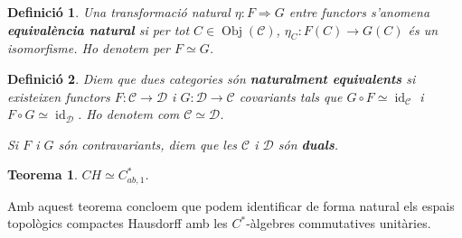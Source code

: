 \documentclass{article}
\newtheorem{teorema}{Teorema}
\newtheorem{definicio}{Definici\'{o}}
\theoremstyle{definition}
\DeclareMathOperator{\Obj}{Obj}
\DeclareMathOperator{\id}{id}
\begin{document}
\begin{definicio}
Una transformaci\'{o} natural $\eta:F\Rightarrow G$ entre functors s'anomena \textbf{equival\`{e}ncia natural} si per tot $C\in\Obj(\mathcal{C})$, $\eta_C:F(C)\rightarrow G(C)$ \'{e}s un isomorfisme. Ho denotem per $F\simeq G$.
\end{definicio}

\begin{definicio}
Diem que dues categories s\'{o}n \textbf{naturalment equivalents} si existeixen functors $F:\mathcal{C}\rightarrow\mathcal{D}$ i $G:\mathcal{D}\rightarrow\mathcal{C}$ covariants tals que $G\circ F\simeq\id_{\mathcal{C}}$ i $F\circ G\simeq\id_{\mathcal{D}}$. Ho denotem com $\mathcal{C}\simeq\mathcal{D}$.

Si $F$ i $G$ s\'{o}n contravariants, diem que les $\mathcal{C}$ i $\mathcal{D}$ s\'{o}n \textbf{duals}.
\end{definicio}

\begin{teorema}
$CH\simeq C_{ab,1}^*$.
\end{teorema}

Amb aquest teorema concloem que podem identificar de forma natural els espais topol\`{o}gics compactes Hausdorff amb les $C^*$-\`{a}lgebres commutatives unit\`{a}ries.
\end{document}
